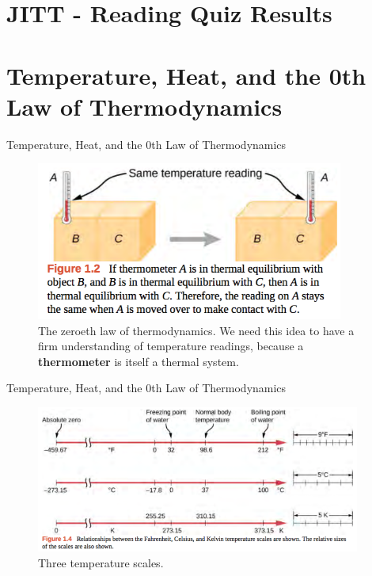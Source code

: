 \documentclass{beamer}
\begin{document}
\section{JITT - Reading Quiz Results}

\section{Temperature, Heat, and the 0th Law of Thermodynamics}

\begin{frame}{Temperature, Heat, and the 0th Law of Thermodynamics}
\begin{figure}
\centering
\includegraphics[width=0.9\textwidth,trim=0cm 4cm 0cm 0cm,clip=true]{figures/zero.png}
\caption{\label{fig:zero} The zeroeth law of thermodynamics.  We need this idea to have a firm understanding of temperature readings, because a \textbf{thermometer} is itself a thermal system.}
\end{figure}
\end{frame}

\begin{frame}{Temperature, Heat, and the 0th Law of Thermodynamics}
\begin{figure}
\centering
\includegraphics[width=0.95\textwidth,trim=0cm 1.5cm 0cm 0cm,clip=true]{figures/temp1.png}
\caption{\label{fig:temp1} Three temperature scales.}
\end{figure}
\end{frame}
\end{document}
